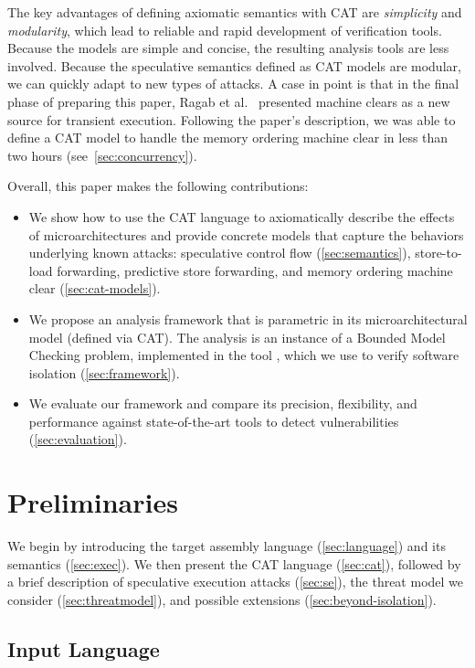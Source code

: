 \documentclass[conference]{IEEEtran}
\begin{document}
The key advantages of defining axiomatic semantics with CAT are \emph{simplicity} and \emph{modularity}, which lead to reliable and rapid development of verification tools.
%
Because the models are simple and concise, the resulting analysis tools are less involved. 
%  
Because the speculative semantics defined as CAT models are modular, we can quickly adapt to new types of attacks. A case in point is that in the final phase of preparing this paper, Ragab et al.~\cite{ragab_rage_2021} presented machine clears as a new source for transient execution. Following the paper's description, we was able to define a CAT model to handle the memory ordering machine clear in less than two hours (see~\autoref{sec:concurrency}).

Overall, this paper makes the following contributions:
\begin{itemize}
  \item We show how to use the CAT language to axiomatically describe the effects of microarchitectures and provide concrete models that capture the behaviors underlying known \spectre attacks: speculative control flow (\autoref{sec:semantics}), store-to-load forwarding, predictive store forwarding, and memory ordering machine clear (\autoref{sec:cat-models}).
  \item We propose an analysis framework that is parametric in its microarchitectural model (defined via CAT). The analysis is an instance of a Bounded Model Checking problem, implemented in the tool \zombmc, which we use to verify software isolation (\autoref{sec:framework}).
  \item We evaluate our framework and compare its precision, flexibility, and performance against state-of-the-art tools to detect \spectre vulnerabilities (\autoref{sec:evaluation}).
\end{itemize}

\section{Preliminaries}
\label{sec:preliminaries}

We begin by introducing the target assembly language (\autoref{sec:language}) and its semantics (\autoref{sec:exec}). 
We then present the CAT language (\autoref{sec:cat}), followed by a brief description of speculative execution attacks (\autoref{sec:se}), the threat model we consider (\autoref{sec:threatmodel}), and possible extensions (\autoref{sec:beyond-isolation}).

\subsection{Input Language}
\label{sec:language}
\end{document}
